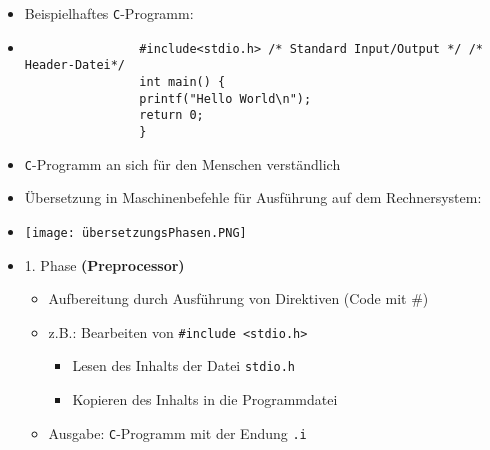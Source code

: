         \begin{itemize}
            \item Beispielhaftes \texttt{C}-Programm:
            \item[]
                \begin{verbatim}
                #include<stdio.h> /* Standard Input/Output */ /* Header-Datei*/
                int main() {
                printf("Hello World\n");
                return 0;
                }
                \end{verbatim}
            \item \texttt{C}-Programm an sich für den Menschen verständlich
            \item Übersetzung in Maschinenbefehle für Ausführung auf dem Rechnersystem:
            \item[] \texttt{[image: übersetzungsPhasen.PNG]}
            \item 1. Phase \textbf{(Preprocessor)}
                \begin{itemize}
                    \item Aufbereitung durch Ausführung von Direktiven (Code mit \#)
                    \item z.B.: Bearbeiten von \texttt{\#include <stdio.h>}
                        \begin{itemize}
                            \item Lesen des Inhalts der Datei \texttt{stdio.h}
                            \item Kopieren des Inhalts in die Programmdatei
                        \end{itemize}
                    \item Ausgabe: \texttt{C}-Programm mit der Endung \texttt{.i} 
                \end{itemize}
            

\end{itemize}
